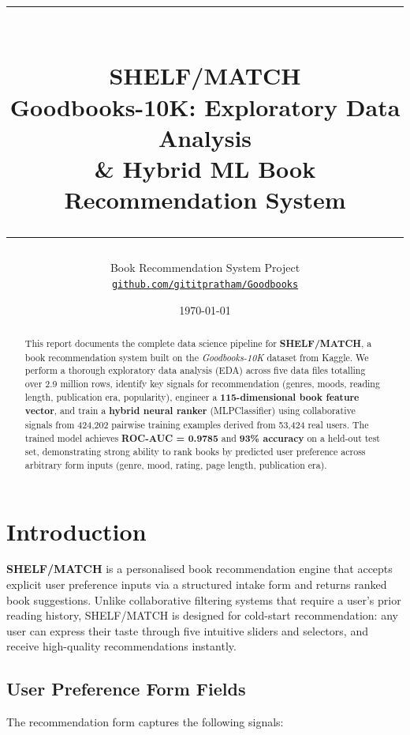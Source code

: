 \documentclass[12pt, a4paper]{article}
\title{
  \vspace{-1cm}
  {\color{shelfRed}\rule{\linewidth}{4pt}}\\[0.6em]
  {\Huge\bfseries SHELF/MATCH}\\[0.2em]
  {\large Goodbooks-10K: Exploratory Data Analysis\\
  \& Hybrid ML Book Recommendation System}\\[0.4em]
  {\color{shelfRed}\rule{\linewidth}{4pt}}
}
\author{
  Book Recommendation System Project\\
  \href{https://github.com/gititpratham/Goodbooks}{\texttt{github.com/gititpratham/Goodbooks}}
}
\date{\today}
\newcommand{\stat}[1]{\textbf{\color{shelfBlue}#1}}
\begin{document}

\maketitle
\thispagestyle{empty}

\begin{abstract}
\noindent
This report documents the complete data science pipeline for \textbf{SHELF/MATCH},
a book recommendation system built on the \emph{Goodbooks-10K} dataset from Kaggle.
We perform a thorough exploratory data analysis (EDA) across five data files
totalling over 2.9 million rows, identify key signals for recommendation
(genres, moods, reading length, publication era, popularity), engineer a
\textbf{115-dimensional book feature vector}, and train a \textbf{hybrid
neural ranker} (MLPClassifier) using collaborative signals from 424{,}202
pairwise training examples derived from 53{,}424 real users.
The trained model achieves \stat{ROC-AUC = 0.9785} and \stat{93\% accuracy}
on a held-out test set, demonstrating strong ability to rank books by predicted
user preference across arbitrary form inputs (genre, mood, rating, page length,
publication era).
\end{abstract}

\tableofcontents
\newpage

\section{Introduction}

\textbf{SHELF/MATCH} is a personalised book recommendation engine that accepts
explicit user preference inputs via a structured intake form and returns ranked
book suggestions. Unlike collaborative filtering systems that require a user's
prior reading history, SHELF/MATCH is designed for cold-start recommendation:
any user can express their taste through five intuitive sliders and selectors,
and receive high-quality recommendations instantly.

\subsection{User Preference Form Fields}
The recommendation form captures the following signals:
\end{document}

